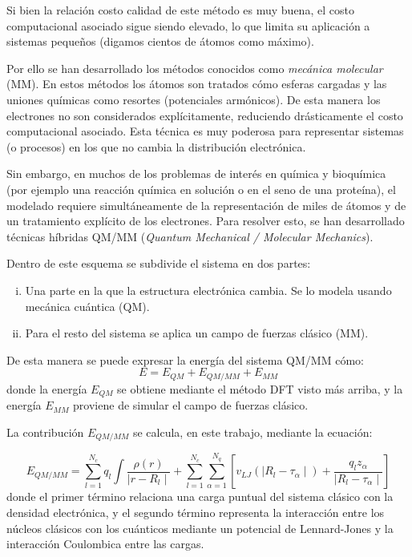 Si bien la relaci\'on costo calidad de este m\'etodo es muy buena, el costo computacional asociado sigue siendo elevado, lo que limita su aplicaci\'on a sistemas peque\~nos (digamos cientos de \'atomos como m\'aximo).

Por ello se han desarrollado los m\'etodos conocidos como \emph{mec\'anica molecular} (MM). 
En estos m\'etodos los \'atomos son tratados c\'omo esferas cargadas y las uniones qu\'imicas como resortes (potenciales arm\'onicos).
De esta manera los electrones no son considerados expl\'icitamente, reduciendo dr\'asticamente el costo computacional asociado. 
Esta t\'ecnica es muy poderosa para representar sistemas (o procesos) en los que no cambia la distribuci\'on electr\'onica.

Sin embargo, en muchos de los problemas de inter\'es en qu\'imica y bioqu\'imica (por ejemplo una reacci\'on qu\'imica en soluci\'on o en el seno de una prote\'ina), el modelado requiere simult\'aneamente de la representaci\'on de miles de \'atomos y de un tratamiento expl\'icito de los electrones.
Para resolver esto, se han desarrollado t\'ecnicas h\'ibridas QM/MM (\textit{Quantum Mechanical / Molecular Mechanics}).

Dentro de este esquema se subdivide el sistema en dos partes:
\begin{enumerate}[i)]
\item Una parte en la que la estructura electr\'onica cambia. Se lo modela usando mec\'anica cu\'antica (QM).

\item Para el resto del sistema se aplica un campo de fuerzas cl\'asico (MM).
\end{enumerate}

De esta manera se puede expresar la energ\'ia del sistema QM/MM c\'omo:
\begin{equation}
    E = E_{QM} + E_{QM/MM} + E_{MM}
\end{equation}
donde la energ\'ia $E_{QM}$ se obtiene mediante el m\'etodo DFT visto m\'as arriba, y la energ\'ia $E_{MM}$ proviene de simular el campo de fuerzas cl\'asico.

La contribuci\'on $E_{QM/MM}$ se calcula, en este trabajo, mediante la ecuaci\'on:

\begin{equation}
    E_{QM/MM} = \sum_{l = 1}^{N_c} q_l \int \frac{\rho(r)}{\mid r - R_l \mid} + \sum_{l = 1}^{N_c}\sum_{\alpha = 1}^{N_q} [ v_{LJ} ( \mid R_l - \tau_\alpha \mid ) + \frac{q_l z_\alpha}{\mid R_l - \tau_\alpha \mid} ]
\end{equation}
donde el primer t\'ermino relaciona una carga puntual del sistema cl\'asico con la densidad electr\'onica, y el segundo t\'ermino representa la interacci\'on entre los n\'ucleos cl\'asicos con los cu\'anticos mediante un potencial de Lennard-Jones y la interacci\'on Coulombica entre las cargas.

